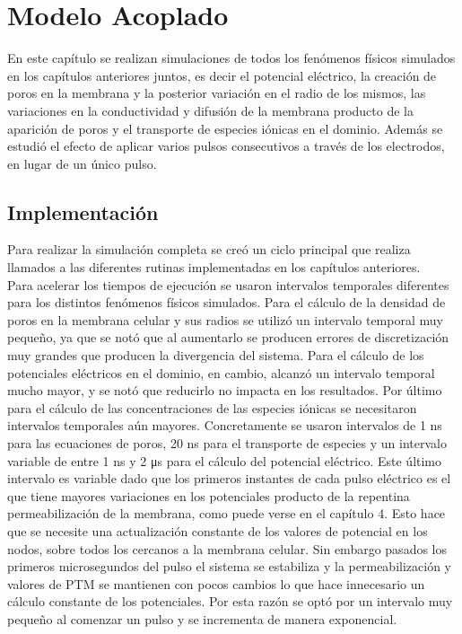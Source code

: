\chapter{Modelo Acoplado} \label{chap:acoplado}

En este capítulo se realizan simulaciones de todos los fenómenos físicos simulados en los capítulos anteriores juntos, es decir el potencial eléctrico, la creación de poros en la membrana y la posterior variación en el radio de los mismos, las variaciones en la conductividad y difusión de la membrana producto de la aparición de poros y el transporte de especies iónicas en el dominio. Además se estudió el efecto de aplicar varios pulsos consecutivos a través de los electrodos, en lugar de un único pulso.

\section{Implementación}
Para realizar la simulación completa se creó un ciclo principal que realiza llamados a las diferentes rutinas implementadas en los capítulos anteriores.\\

Para acelerar los tiempos de ejecución se usaron intervalos temporales diferentes para los distintos fenómenos físicos simulados. Para el cálculo de la densidad de poros en la membrana celular y sus radios se utilizó un intervalo temporal muy pequeño, ya que se notó que al aumentarlo se producen errores de discretización muy grandes que producen la divergencia del sistema. Para el cálculo de los potenciales eléctricos en el dominio, en cambio, alcanzó un intervalo temporal mucho mayor, y se notó que reducirlo no impacta en los resultados. Por último para el cálculo de las concentraciones de las especies iónicas se necesitaron intervalos temporales aún mayores. Concretamente se usaron intervalos de 1 \si{\nano\second} para las ecuaciones de poros, 20 \si{\nano\second} para el transporte de especies y un intervalo variable de entre 1 \si{\nano\second} y 2 \si{\micro\second} para el cálculo del potencial eléctrico. Este último intervalo es variable dado que los primeros instantes de cada pulso eléctrico es el que tiene mayores variaciones en los potenciales producto de la repentina permeabilización de la membrana, como puede verse en el capítulo 4. Esto hace que se necesite una actualización constante de los valores de potencial en los nodos, sobre todos los cercanos a la membrana celular. Sin embargo pasados los primeros microsegundos del pulso el sistema se estabiliza y la permeabilización y valores de PTM se mantienen con pocos cambios lo que hace innecesario un cálculo constante de los potenciales. Por esta razón se optó por un intervalo muy pequeño al comenzar un pulso y se incrementa de manera exponencial.\\

